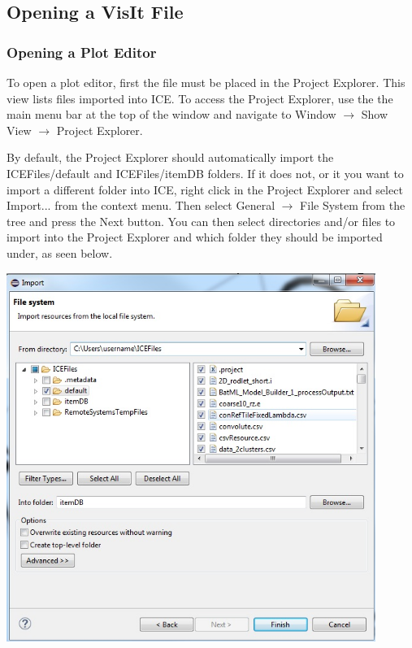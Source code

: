 \documentclass{article}
\begin{document}
\subsection{Opening a VisIt File}

\subsubsection{Opening a Plot Editor} 

To open a plot editor, first the file must be placed in the Project Explorer.
This view lists files imported into ICE. To access the Project Explorer, use the
the main menu bar at the top of the window and navigate to Window $\rightarrow$
Show View $\rightarrow$ Project Explorer. 

By default, the Project Explorer should automatically import the
ICEFiles/default and ICEFiles/itemDB folders. If it does not, or it you want to
import a different folder into ICE, right click in the Project Explorer and
select Import... from the context menu. Then select General $\rightarrow$ File
System from the tree and press the Next button. You can then select directories
and/or files to import into the Project Explorer and which folder they should be
imported under, as seen below.

\begin{center}
\includegraphics[width=12cm]{images/ImportFileDialog}
\end{center}
\end{document}
